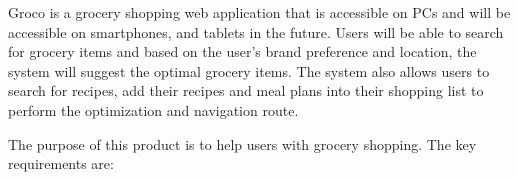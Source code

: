 Groco is a grocery shopping web application that is accessible on PCs and will be accessible on smartphones, and tablets in the future. Users will be able to search for grocery items and based on the user's brand preference and location, the system will suggest the optimal grocery items. The system also allows users to search for recipes, add their recipes and meal plans into their shopping list to perform the optimization and navigation route.

The purpose of this product is to help users with grocery shopping. The key requirements are:
